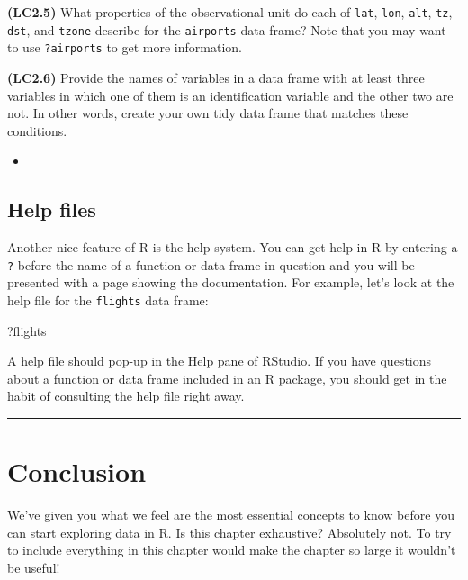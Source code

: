 \documentclass[12pt, krantz2,]{krantz}
\makeatletter
\newenvironment{Shaded}{\begin{snugshade}}{\end{snugshade}}
\newcommand{\NormalTok}[1]{#1}
\newenvironment{kframe}{%
\medskip{}
\setlength{\fboxsep}{.8em}
 \def\at@end@of@kframe{}%
 \ifinner\ifhmode%
  \def\at@end@of@kframe{\end{minipage}}%
  \begin{minipage}{\columnwidth}%
 \fi\fi%
 \def\FrameCommand##1{\hskip\@totalleftmargin \hskip-\fboxsep
 \colorbox{shadecolor}{##1}\hskip-\fboxsep
     \hskip-\linewidth \hskip-\@totalleftmargin \hskip\columnwidth}%
 \MakeFramed {\advance\hsize-\width
   \@totalleftmargin\z@ \linewidth\hsize
   \@setminipage}}%
 {\par\unskip\endMakeFramed%
 \at@end@of@kframe}
\renewenvironment{Shaded}{\begin{kframe}}{\end{kframe}}
\newenvironment{rmdblock}[1]
  {\begin{shaded*}
  \begin{itemize}
  \renewcommand{\labelitemi}{
    \raisebox{-.7\height}[0pt][0pt]{
    }
  }
  \item
  }
  {
  \end{itemize}
  \end{shaded*}
  }
\newenvironment{learncheck}
  {\begin{rmdblock}{warning}}
  {\end{rmdblock}}
\makeatother
\begin{document}
\textbf{(LC2.5)} What properties of the observational unit do each of \texttt{lat}, \texttt{lon}, \texttt{alt}, \texttt{tz}, \texttt{dst}, and \texttt{tzone} describe for the \texttt{airports} data frame? Note that you may want to use \texttt{?airports} to get more information.

\textbf{(LC2.6)} Provide the names of variables in a data frame with at least three variables in which one of them is an identification variable and the other two are not. In other words, create your own tidy data frame that matches these conditions.

\begin{learncheck}

\end{learncheck}

\hypertarget{help-files}{%
\subsection{Help files}\label{help-files}}

Another nice feature of R is the help system. You can get help in R by entering a \texttt{?} before the name of a function or data frame in question and you will be presented with a page showing the documentation. For example, let's look at the help file for the \texttt{flights} data frame:

\begin{Shaded}
\begin{Highlighting}[]
\NormalTok{?flights}
\end{Highlighting}
\end{Shaded}

A help file should pop-up in the Help pane of RStudio. If you have questions about a function or data frame included in an R package, you should get in the habit of consulting the help file right away.

\begin{center}\rule{0.5\linewidth}{\linethickness}\end{center}

\hypertarget{conclusion}{%
\section{Conclusion}\label{conclusion}}

We've given you what we feel are the most essential concepts to know before you can start exploring data in R. Is this chapter exhaustive? Absolutely not. To try to include everything in this chapter would make the chapter so large it wouldn't be useful!
\end{document}
